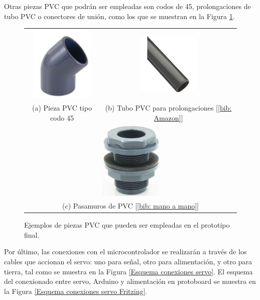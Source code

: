 \documentclass[12pt]{article}
\begin{document}
	\noindent Otras piezas PVC que podrán ser empleadas son codos de 45\degree, prolongaciones de tubo PVC o conectores de unión, como los que se muestran en la Figura \ref{fig: piezas PVC posibles.}.\\
	
	\begin{figure}[h!]
		\begin{center}
			\begin{tabular}{cc}
				\includegraphics[width=30mm]{img/pieza_pvc_codo45.png} &   \includegraphics[width=30mm]{img/tubo_pvc.jpg} \\
				(a) Pieza PVC tipo codo 45\degree [\ref{bib: Poolaria}] & (b) Tubo PVC para prolongaciones [\ref{bib: Amazon}]\\[6pt]
				\multicolumn{2}{c}{\includegraphics[width=30mm]{img/pasamuro_pvc.png} }\\
				\multicolumn{2}{c}{(c) Pasamuros de PVC [\ref{bib: mano a mano}]}
			\end{tabular}
			\caption{Ejemplos de piezas PVC que pueden ser empleadas en el prototipo final.}
			\label{fig: piezas PVC posibles.}
		\end{center}
	\end{figure}
	
	\pagebreak
	
	\noindent Por último, las conexiones con el microcontrolador se realizarán a través de los cables que accionan el servo: uno para señal, otro para alimentación, y otro para tierra, tal como se muestra en la Figura \ref{Esquema conexiones servo}. El esquema del conexionado entre servo, Arduino y alimentación en protoboard se muestra en la Figura \ref{Esquema conexiones servo Fritzing}.\\
	
\end{document}
